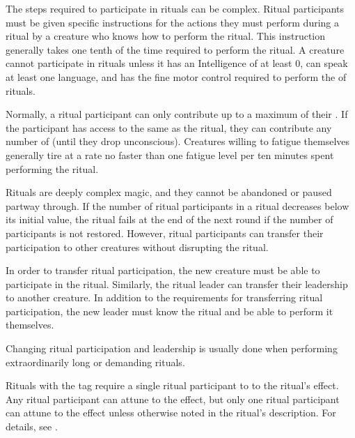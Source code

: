             The steps required to participate in rituals can be complex.
            Ritual participants must be given specific instructions for the actions they must perform during a ritual by a creature who knows how to perform the ritual.
            This instruction generally takes one tenth of the time required to perform the ritual.
            A creature cannot participate in rituals unless it has an Intelligence of at least 0, can speak at least one language, and has the fine motor control required to perform the  of rituals.

            Normally, a ritual participant can only contribute  up to a maximum of their .
            If the participant has access to the same  as the ritual, they can contribute any number of  (until they drop unconscious).
            Creatures willing to fatigue themselves generally tire at a rate no faster than one fatigue level per ten minutes spent performing the ritual.

            Rituals are deeply complex magic, and they cannot be abandoned or paused partway through.
            If the number of ritual participants in a ritual decreases below its initial value, the ritual fails at the end of the next round if the number of participants is not restored.
            However, ritual participants can transfer their participation to other creatures without disrupting the ritual.

            In order to transfer ritual participation, the new creature must be able to participate in the ritual.
            Similarly, the ritual leader can transfer their leadership to another creature.
            In addition to the requirements for transferring ritual participation, the new leader must know the ritual and be able to perform it themselves.

            Changing ritual participation and leadership is usually done when performing extraordinarily long or demanding rituals.

                Rituals with the  tag require a single ritual participant to  to the ritual's effect.
                Any ritual participant can attune to the effect, but only one ritual participant can attune to the effect unless otherwise noted in the ritual's description.
                For details, see .

